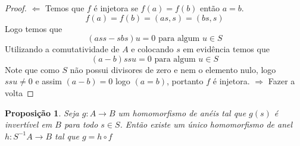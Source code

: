 \documentclass[10pt,a4paper]{article}
\newtheorem{proposition}[theorem]{Proposição}
\begin{document}
\begin{proof}
	$\Leftarrow$ Temos que $f$ é injetora se $f(a)=f(b)$ então $a=b$.
	$$f(a)=f(b)=(as,s)=(bs,s)$$
	Logo temos que
	$$(ass-sbs)u=0 \textrm{ para algum } u \in S$$
	Utilizando a comutatividade de $A$ e colocando $s$ em evidência temos que
	$$(a-b)ssu=0 \textrm{ para algum } u \in S$$
	Note que como $S$ não possui divisores de zero e nem o elemento nulo, logo $ssu \neq 0$ e assim $(a-b)=0$ logo $(a=b)$, portanto $f$ é injetora.	
	\newline
	$\Rightarrow$ Fazer a volta
\end{proof}

\begin{proposition} Seja $g:A \rightarrow B$ um homomorfismo de anéis tal que $g(s)$ é invertível em $B$ para todo $s \in S$. Então existe um único homomorfismo de anel $h:S^{-1}A \rightarrow B$ tal que $g = h\circ f$
\end{proposition}
\end{document}
